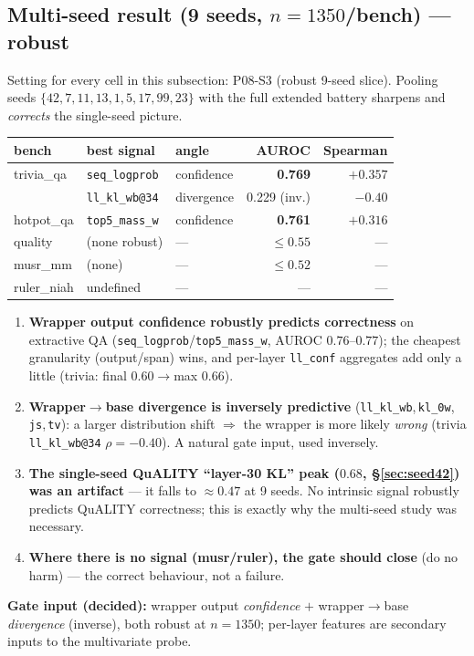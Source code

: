 \documentclass[11pt]{article}
\newcommand{\code}[1]{\texttt{#1}}
\begin{document}
\subsection{Multi-seed result (9 seeds, $n{=}1350$/bench) --- robust}
\label{sec:multiseed}
Setting for every cell in this subsection: P08-S3 (robust 9-seed slice).
Pooling seeds $\{42,7,11,13,1,5,17,99,23\}$ with the full extended
battery sharpens and \emph{corrects} the single-seed picture.
\begin{center}\small
\begin{tabular}{l l l r r}
\toprule
bench & best signal & angle & AUROC & Spearman\\
\midrule
trivia\_qa  & \code{seq\_logprob}  & confidence & \textbf{0.769} & $+0.357$\\
            & \code{ll\_kl\_wb@34} & divergence & 0.229 (inv.)   & $-0.40$\\
hotpot\_qa  & \code{top5\_mass\_w} & confidence & \textbf{0.761} & $+0.316$\\
quality     & (none robust)        & ---        & $\le 0.55$     & ---\\
musr\_mm    & (none)               & ---        & $\le 0.52$     & ---\\
ruler\_niah & undefined            & ---        & ---            & ---\\
\bottomrule
\end{tabular}
\end{center}
\begin{enumerate}
\item \textbf{Wrapper output confidence robustly predicts correctness}
on extractive QA (\code{seq\_logprob}/\code{top5\_mass\_w}, AUROC
$0.76$--$0.77$); the cheapest granularity (output/span) wins, and
per-layer \code{ll\_conf} aggregates add only a little (trivia: final
$0.60\!\to\!$max $0.66$).
\item \textbf{Wrapper$\to$base divergence is inversely predictive}
(\code{ll\_kl\_wb},\,\code{kl\_0w},\,\code{js},\,\code{tv}): a larger
distribution shift $\Rightarrow$ the wrapper is more likely
\emph{wrong} (trivia \code{ll\_kl\_wb@34} $\rho{=}{-}0.40$). A natural
gate input, used inversely.
\item \textbf{The single-seed QuALITY ``layer-30 KL'' peak ($0.68$,
\S\ref{sec:seed42}) was an artifact} --- it falls to $\approx 0.47$ at
9 seeds. No intrinsic signal robustly predicts QuALITY correctness;
this is exactly why the multi-seed study was necessary.
\item \textbf{Where there is no signal (musr/ruler), the gate should
close} (do no harm) --- the correct behaviour, not a failure.
\end{enumerate}
\noindent\textbf{Gate input (decided):} wrapper output \emph{confidence}
$+$ wrapper$\to$base \emph{divergence} (inverse), both robust at
$n{=}1350$; per-layer features are secondary inputs to the multivariate
probe.
\end{document}
